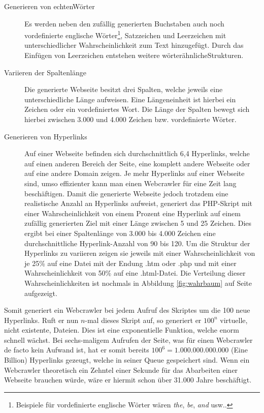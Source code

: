 \begin{description}
	\item[Generieren von \grqq echten\grqq\space Wörter] Es werden neben den zufällig generierten Buchstaben auch noch vordefinierte englische Wörter\footnote{Beispiele für vordefinierte englische Wörter wären \emph{the}, \emph{be}, \emph{and} usw..}, Satzzeichen und Leerzeichen mit unterschiedlicher Wahrscheinlichkeit zum Text hinzugefügt. Durch das Einfügen von Leerzeichen entstehen weitere \grqq wörterähnliche\grqq\space Strukturen.
	\item[Variieren der Spaltenlänge] Die generierte Webseite besitzt drei Spalten, welche jeweils eine unterschiedliche Länge aufweisen. Eine Längeneinheit ist hierbei ein Zeichen oder ein vordefiniertes Wort. Die Länge der Spalten bewegt sich hierbei zwischen 3.000 und 4.000 Zeichen bzw. vordefinierte Wörter.
	\item[Generieren von Hyperlinks] Auf einer Webseite befinden sich durchschnittlich 6,4 Hyperlinks, welche auf einen anderen Bereich der Seite, eine komplett andere Webseite oder auf eine andere Domain zeigen.\cite{tarpitting-http-linux-mag} Je mehr Hyperlinks auf einer Webseite sind, umso effizienter kann man einen Webcrawler für eine Zeit lang \glqq beschäftigen\grqq . Damit die generierte Webseite jedoch trotzdem eine realistische Anzahl an Hyperlinks aufweist, generiert das PHP-Skript mit einer Wahrscheinlichkeit von einem Prozent eine Hyperlink auf einem zufällig generierten Ziel mit einer Länge zwischen 5 und 25 Zeichen. Dies ergibt bei einer Spaltenlänge von 3.000 bis 4.000 Zeichen eine durchschnittliche Hyperlink-Anzahl von 90 bis 120. Um die Struktur der Hyperlinks zu variieren zeigen sie jeweils mit einer Wahrscheinlichkeit von je 25\% auf eine Datei mit der Endung .htm oder .php und mit einer Wahrscheinlichkeit von 50\% auf eine .html-Datei. Die Verteilung dieser Wahrscheinlichkeiten ist nochmals in Abbildung \ref{fig:wahrbaum} auf Seite \pageref{fig:wahrbaum} aufgezeigt.
\end{description}
Somit generiert ein Webcrawler bei jedem Aufruf des Skriptes um die 100 neue Hyperlinks. Ruft er nun $n$-mal dieses Skript auf, so generiert er $100^n$ virtuelle, nicht existente, Dateien. Dies ist eine exponentielle Funktion, welche enorm schnell wächst. Bei sechs-maligem Aufrufen der Seite, was für einen Webcrawler de facto kein Aufwand ist, hat er somit bereits $100^6 = 1.000.000.000.000$ (Eine Billion) Hyperlinks gezeugt, welche in seiner Queue gespeichert sind. Wenn ein Webcrawler theoretisch ein Zehntel einer Sekunde für das Abarbeiten einer Webseite brauchen würde, wäre er hiermit schon über 31.000 Jahre beschäftigt.\\
